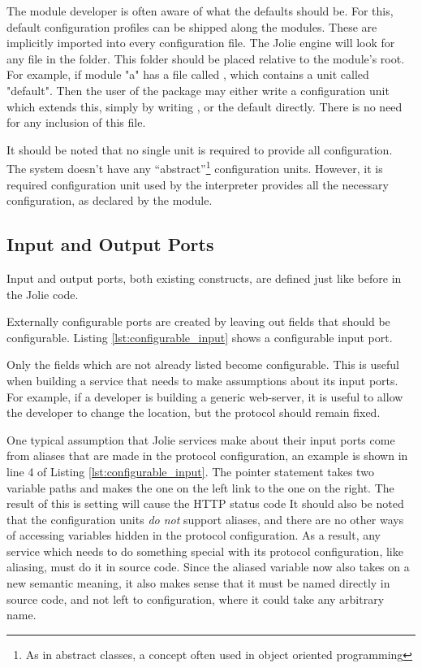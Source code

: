 The module developer is often aware of what the defaults should be. For this,
default configuration profiles can be shipped along the modules. These
are implicitly imported into every configuration file. The Jolie engine will
look for any  file in the  folder. This folder should be
placed relative to the module's root. For example, if module "a" has a file
called , which contains a unit called "default".
Then the user of the package may either write a configuration unit which
extends this, simply by writing , or the default directly. There is no need for any
    inclusion of this file.

It should be noted that no single unit is required to provide all
configuration. The system doesn't have any ``abstract''\footnote{As in abstract
classes, a concept often used in object oriented programming} configuration
units. However, it is required configuration unit used by the interpreter
provides all the necessary configuration, as declared by the module.

\subsection{Input and Output Ports}

Input and output ports, both existing constructs, are defined just like before
in the Jolie code.

Externally configurable ports are created by leaving out fields that should be
configurable. Listing \ref{lst:configurable_input} shows a configurable input
port.

Only the fields which are not already listed become configurable. This is
useful when building a service that needs to make assumptions about its input
ports. For example, if a developer is building a generic web-server, it is
useful to allow the developer to change the location, but the protocol should
remain fixed.

One typical assumption that Jolie services make about their input ports come
from aliases that are made in the protocol configuration, an example is shown
in line 4 of Listing \ref{lst:configurable_input}. The pointer statement takes
two variable paths and makes the one on the left link to the one on the right.
The result of this is setting  will cause the HTTP status code
It should also be noted that the configuration units \emph{do not} support
aliases, and there are no other ways of accessing variables hidden in the
protocol configuration. As a result, any service which needs to do something
special with its protocol configuration, like aliasing, must do it in source
code. Since the aliased variable now also takes on a new semantic meaning, it
also makes sense that it must be named directly in source code, and not left to
configuration, where it could take any arbitrary name.

